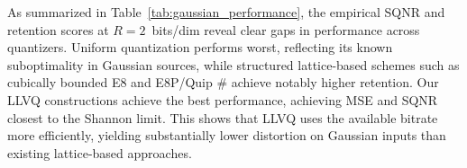 \documentclass{article}
\theoremstyle{plain}
\theoremstyle{definition}
\theoremstyle{remark}
\begin{document}
As summarized in Table~\ref{tab:gaussian_performance}, the empirical SQNR and retention scores at $R=2$~bits/dim reveal clear gaps in performance across quantizers. Uniform quantization performs worst, reflecting its known suboptimality in Gaussian sources, while structured lattice-based schemes such as cubically bounded E8 and E8P/Quip \# achieve notably higher retention. Our LLVQ constructions achieve the best performance, achieving MSE and SQNR closest to the Shannon limit. This shows that LLVQ uses the available bitrate more efficiently, yielding substantially lower distortion on Gaussian inputs than existing lattice-based approaches.


\begin{table}[t]
\centering
\caption{Comparison with wider set of methods for quantizing Llama-v2 7B model using different quantization methods, evaluated by wikitext-2 (Wiki) perplexity at 4096 context length and downstream task performance (CSR and MMLU), comparing results in literature. LLVQ consistently outperforms standard vector quantization approaches in performance against bits per parameter (Bits).}
\vspace{-0.5em}
\label{tab:ptq-performance-literature}
\end{table}
\end{document}

